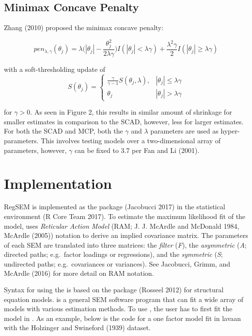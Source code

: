 \documentclass[article]{jss}
\begin{document}
\subsection{Minimax Concave Penalty}\label{minimax-concave-penalty}

Zhang (2010) proposed the minimax concave penalty:

\[
pen_{\lambda,\gamma}(\theta_{j}) = \lambda\bigg(|\theta_{j}|-\frac{\theta_{j}^{2}}{2\lambda\gamma}\bigg)I(|\theta_{j}|<\lambda\gamma) +\frac{\lambda^{2}\gamma}{2}I(|\theta_{j}|\geq \lambda\gamma)
\]

\noindent
with a soft-thresholding update of \[
S(\theta_{j})= 
\begin{cases}
\frac{\gamma}{\gamma-1}S(\theta_{j},\lambda),&  |\theta_{j}| \leq \lambda\gamma\\
\theta_{j} & |\theta_{j}| > \lambda \gamma
\end{cases}
\]

\noindent
for \(\gamma > 0\). As seen in Figure 2, this results in similar amount
of shrinkage for smaller estimates in comparison to the SCAD, however,
less for larger estimates. For both the SCAD and MCP, both the
\(\gamma\) and \(\lambda\) parameters are used as hyper-parameters. This
involves testing models over a two-dimensional array of parameters,
however, \(\gamma\) can be fixed to 3.7 per Fan and Li (2001).

\section{Implementation}\label{implementation}

RegSEM is implemented as the  package (Jacobucci 2017) in
the  statistical environment (R Core Team 2017). To estimate
the maximum likelihood fit of the model,  uses
\textit{Reticular Action Model} (RAM; J. J. McArdle and McDonald 1984,
McArdle (2005)) notation to derive an implied covariance matrix. The
parameters of each SEM are translated into three matrices: the
\textit{filter} (\textit{F}), the \textit{asymmetric} (\textit{A};
directed paths; e.g.~factor loadings or regressions), and the
\textit{symmetric} (\textit{S}; undirected paths; e.g.~covariances or
variances). See Jacobucci, Grimm, and McArdle (2016) for more detail on
RAM notation.

Syntax for using the  is based on the  package
(Rosseel 2012) for structural equation models.  is a general
SEM software program that can fit a wide array of models with various
estimation methods. To use , the user has to first fit the
model in . As an example, below is the code for a one factor
model fit in lavaan with the Holzinger and Swineford (1939) dataset.
\end{document}

